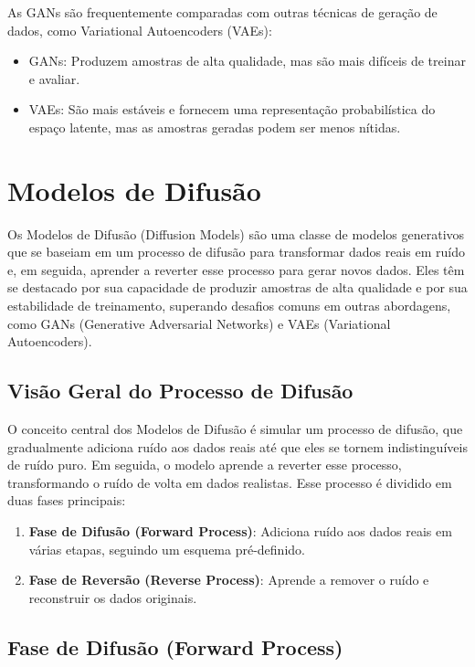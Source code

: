 \documentclass{tufte-handout}
\begin{document}
As GANs são frequentemente comparadas com outras técnicas de geração de dados, como Variational Autoencoders (VAEs):
\begin{itemize}
    \item GANs: Produzem amostras de alta qualidade, mas são mais difíceis de treinar e avaliar.
    \item VAEs: São mais estáveis e fornecem uma representação probabilística do espaço latente, mas as amostras geradas podem ser menos nítidas.
\end{itemize}

\section{Modelos de Difusão}

Os Modelos de Difusão (Diffusion Models) são uma classe de modelos generativos que se baseiam em um processo de difusão para transformar dados reais em ruído e, em seguida, aprender a reverter esse processo para gerar novos dados. Eles têm se destacado por sua capacidade de produzir amostras de alta qualidade e por sua estabilidade de treinamento, superando desafios comuns em outras abordagens, como GANs (Generative Adversarial Networks) e VAEs (Variational Autoencoders).

\subsection{Visão Geral do Processo de Difusão}

O conceito central dos Modelos de Difusão é simular um processo de difusão, que gradualmente adiciona ruído aos dados reais até que eles se tornem indistinguíveis de ruído puro. Em seguida, o modelo aprende a reverter esse processo, transformando o ruído de volta em dados realistas. Esse processo é dividido em duas fases principais:
\begin{enumerate}
    \item \textbf{Fase de Difusão (Forward Process)}: Adiciona ruído aos dados reais em várias etapas, seguindo um esquema pré-definido.
    \item \textbf{Fase de Reversão (Reverse Process)}: Aprende a remover o ruído e reconstruir os dados originais.
\end{enumerate}

\subsection{Fase de Difusão (Forward Process)}
\end{document}
